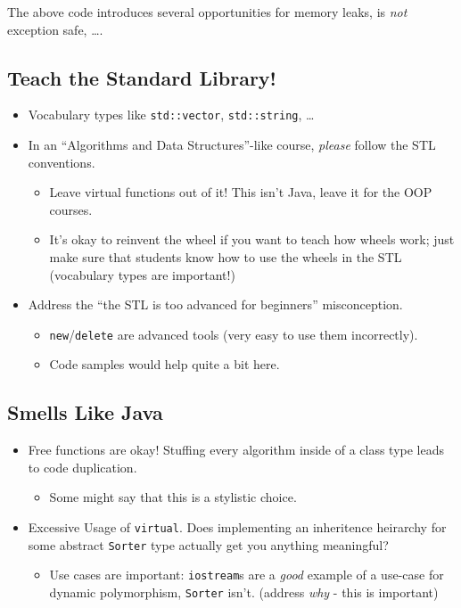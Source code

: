 \documentclass{article}
\newcommand{\CppNew}{\texttt{new}}
\newcommand{\CppDelete}{\texttt{delete}}
\newcommand{\placeholdertext}[1]{
	\noindent{\color{red}{#1}}
}
\begin{document}
The above code introduces several opportunities for memory leaks, is \emph{not} exception safe, \ldots.  








\subsection*{Teach the Standard Library!}
\placeholdertext{Address the following:}
\begin{itemize}
	\item Vocabulary types like \texttt{std::vector}, \texttt{std::string}, \ldots
	\item In an ``Algorithms and Data Structures''-like course, \emph{please} follow the STL conventions.
	\begin{itemize}
		\item Leave virtual functions out of it!  This isn't Java, leave it for the OOP courses.
		\item It's okay to reinvent the wheel if you want to teach how wheels work; just make sure that students know how to use the wheels in the STL (vocabulary types are important!)
	\end{itemize}
	\item Address the ``the STL is too advanced for beginners'' misconception.
	\begin{itemize}
		\item \CppNew{}/\CppDelete{} are advanced tools (very easy to use them incorrectly).
		\item Code samples would help quite a bit here.
	\end{itemize}
\end{itemize}



\subsection*{Smells Like Java}
\placeholdertext{Address the following:}
\begin{itemize}
	\item Free functions are okay!  Stuffing every algorithm inside of a class type leads to code duplication.
	\begin{itemize}
		\item Some might say that this is a stylistic choice.  
	\end{itemize}
	\item Excessive Usage of \texttt{virtual}.  Does implementing an inheritence heirarchy for some abstract \texttt{Sorter} type actually get you anything meaningful?
	\begin{itemize}
		\item Use cases are important:  \texttt{iostream}s are a \emph{good} example of a use-case for dynamic polymorphism, \texttt{Sorter} isn't.  (address \emph{why} - this is important)
	\end{itemize}
\end{itemize}



\end{document}
